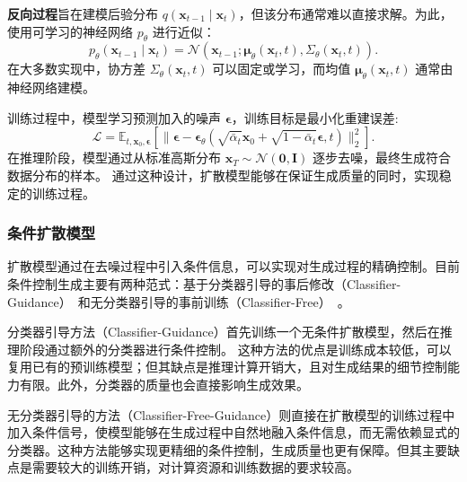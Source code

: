 \textbf{反向过程}旨在建模后验分布 $q(\mathbf{x}_{t-1} \mid \mathbf{x}_t)$，但该分布通常难以直接求解。为此，使用可学习的神经网络 $p_{\theta}$ 进行近似：
\begin{equation}
    p_{\theta}(\mathbf{x}_{t-1} \mid \mathbf{x}_t) = \mathcal{N}(\mathbf{x}_{t-1}; \boldsymbol{\mu}_{\theta}(\mathbf{x}_t, t), \Sigma_{\theta}(\mathbf{x}_t, t)).
\end{equation}
在大多数实现中，协方差 $\Sigma_{\theta}(\mathbf{x}_t, t)$ 可以固定或学习，而均值 $\boldsymbol{\mu}_{\theta}(\mathbf{x}_t, t)$ 通常由神经网络建模。

训练过程中，模型学习预测加入的噪声 $\boldsymbol{\epsilon}$，训练目标是最小化重建误差:
\begin{equation}
    \mathcal{L} = \mathbb{E}_{t,\mathbf{x}_0,\boldsymbol{\epsilon}}[\|\boldsymbol{\epsilon} - \boldsymbol{\epsilon}_\theta(\sqrt{\bar{\alpha}_t}\mathbf{x}_0 + \sqrt{1-\bar{\alpha}_t}\boldsymbol{\epsilon},t)\|_2^2].
\end{equation}
在推理阶段，模型通过从标准高斯分布 $\mathbf{x}_T \sim \mathcal{N}(\mathbf{0}, \mathbf{I})$ 逐步去噪，最终生成符合数据分布的样本。
通过这种设计，扩散模型能够在保证生成质量的同时，实现稳定的训练过程。


\subsubsection{条件扩散模型}
扩散模型通过在去噪过程中引入条件信息，可以实现对生成过程的精确控制。目前条件控制生成主要有两种范式：基于分类器引导的事后修改（Classifier-Guidance）~\cite{dhariwal2021diffusion}和无分类器引导的事前训练（Classifier-Free）~\cite{ho2022classifier}。

分类器引导方法（Classifier-Guidance）首先训练一个无条件扩散模型，然后在推理阶段通过额外的分类器进行条件控制。
这种方法的优点是训练成本较低，可以复用已有的预训练模型；但其缺点是推理计算开销大，且对生成结果的细节控制能力有限。此外，分类器的质量也会直接影响生成效果。

无分类器引导的方法（Classifier-Free-Guidance）则直接在扩散模型的训练过程中加入条件信号，使模型能够在生成过程中自然地融入条件信息，而无需依赖显式的分类器。这种方法能够实现更精细的条件控制，生成质量也更有保障。但其主要缺点是需要较大的训练开销，对计算资源和训练数据的要求较高。

